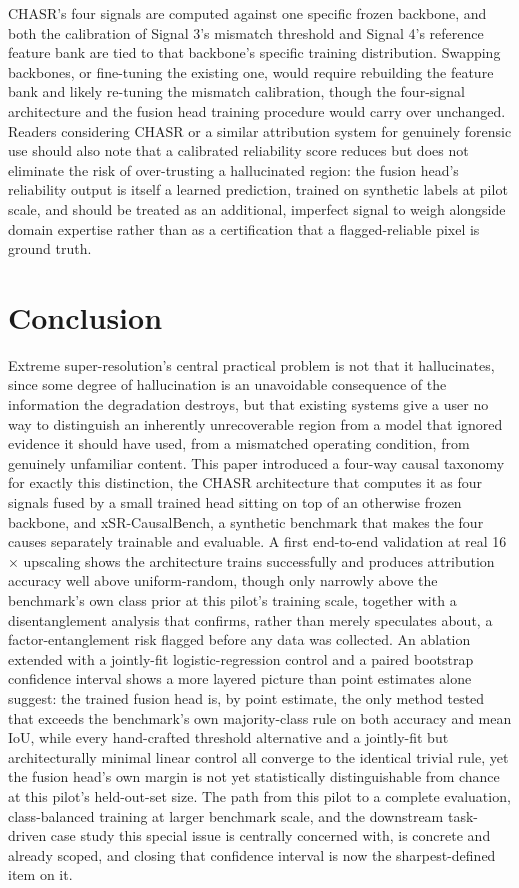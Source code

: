 \documentclass[review]{elsarticle}
\begin{document}
CHASR's four signals are computed against one specific frozen backbone, and both the calibration of Signal 3's mismatch threshold and Signal 4's reference feature bank are tied to that backbone's specific training distribution. Swapping backbones, or fine-tuning the existing one, would require rebuilding the feature bank and likely re-tuning the mismatch calibration, though the four-signal architecture and the fusion head training procedure would carry over unchanged. Readers considering CHASR or a similar attribution system for genuinely forensic use should also note that a calibrated reliability score reduces but does not eliminate the risk of over-trusting a hallucinated region: the fusion head's reliability output is itself a learned prediction, trained on synthetic labels at pilot scale, and should be treated as an additional, imperfect signal to weigh alongside domain expertise rather than as a certification that a flagged-reliable pixel is ground truth.

\FloatBarrier
\section{Conclusion}
\label{sec:conclusion}

Extreme super-resolution's central practical problem is not that it hallucinates, since some degree of hallucination is an unavoidable consequence of the information the degradation destroys, but that existing systems give a user no way to distinguish an inherently unrecoverable region from a model that ignored evidence it should have used, from a mismatched operating condition, from genuinely unfamiliar content. This paper introduced a four-way causal taxonomy for exactly this distinction, the CHASR architecture that computes it as four signals fused by a small trained head sitting on top of an otherwise frozen backbone, and xSR-CausalBench, a synthetic benchmark that makes the four causes separately trainable and evaluable. A first end-to-end validation at real 16$\times$ upscaling shows the architecture trains successfully and produces attribution accuracy well above uniform-random, though only narrowly above the benchmark's own class prior at this pilot's training scale, together with a disentanglement analysis that confirms, rather than merely speculates about, a factor-entanglement risk flagged before any data was collected. An ablation extended with a jointly-fit logistic-regression control and a paired bootstrap confidence interval shows a more layered picture than point estimates alone suggest: the trained fusion head is, by point estimate, the only method tested that exceeds the benchmark's own majority-class rule on both accuracy and mean IoU, while every hand-crafted threshold alternative and a jointly-fit but architecturally minimal linear control all converge to the identical trivial rule, yet the fusion head's own margin is not yet statistically distinguishable from chance at this pilot's held-out-set size. The path from this pilot to a complete evaluation, class-balanced training at larger benchmark scale, and the downstream task-driven case study this special issue is centrally concerned with, is concrete and already scoped, and closing that confidence interval is now the sharpest-defined item on it.
\end{document}
